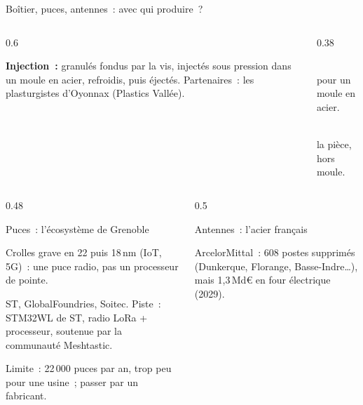 \begin{frame}{Boîtier, puces, antennes~: avec qui produire~?}
\begin{columns}[T]
\begin{column}{0.6\textwidth}
      \vspace{0cm}
      {\footnotesize\raggedright
       \textbf{Injection~:} granulés fondus par la vis, injectés sous pression dans un moule en acier,
       refroidis, puis éjectés. Partenaires~: les plasturgistes d'Oyonnax (Plastics Vallée).\par}
    \end{column}
    \begin{column}{0.38\textwidth}
      \vspace{-0.3cm}
      \begin{carte}[height=1.05cm,valign=top]
        \raggedright{}\\[1pt]
        {\footnotesize pour un moule en acier.}
      \end{carte}
      \vspace{-0.15cm}
      \begin{carte}[height=1.05cm,valign=top]
        \raggedright{}\\[1pt]
        {\footnotesize la pièce, hors moule.}
      \end{carte}
    \end{column}
  \end{columns}
  \vspace{0.02cm}
  \begin{columns}[T]
    \begin{column}{0.48\textwidth}
      \begin{encadre}{Puces~: l'écosystème de Grenoble}
        \begin{puces}
          \item Crolles grave en 22 puis 18\,nm (IoT, 5G)~: une puce radio, pas un processeur de pointe.
          \item ST, GlobalFoundries, Soitec. Piste~: STM32WL de ST, radio LoRa + processeur, soutenue par la communauté Meshtastic.
          \item Limite~: 22\,000 puces par an, trop peu pour une usine~; passer par un fabricant.
        \end{puces}
      \end{encadre}
    \end{column}
    \begin{column}{0.5\textwidth}
      \begin{encadre}{Antennes~: l'acier français}
        \begin{puces}
          \item ArcelorMittal~: 608 postes supprimés (Dunkerque, Florange, Basse-Indre…), mais 1,3\,Md€ en four électrique (2029).

\end{puces}
\end{encadre}
\end{column}
\end{columns}
\end{frame}
